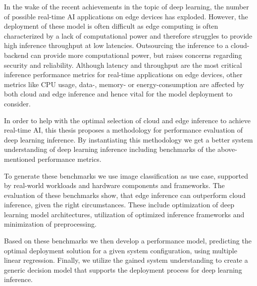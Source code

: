 \noindent In the wake of the recent achievements in the topic of deep learning, the number of possible real-time AI applications on edge devices has exploded.
However, the deployment of these model is often difficult as edge computing is often characterized by a lack of computational power and therefore struggles to provide high inference throughput at low latencies.
Outsourcing the inference to a cloud-backend can provide more computational power, but raises concerns regarding security and reliability. 
Although latency and throughput are the most critical inference performance metrics for real-time applications on edge devices, other metrics like CPU usage, data-, memory- or energy-consumption are affected by both cloud and edge inference and hence vital for the model deployment to consider.

In order to help with the optimal selection of cloud and edge inference to achieve real-time AI, this thesis proposes a methodology for performance evaluation of deep learning inference.
By instantiating this methodology we get a better system understanding of deep learning inference including benchmarks of the above-mentioned performance metrics.

To generate these benchmarks we use image classification as use case, supported by real-world workloads and hardware components and frameworks.
The evaluation of these benchmarks show, that edge inference can outperform cloud inference, given the right circumstances.
These include optimization of deep learning model architectures, utilization of optimized inference frameworks and minimization of preprocessing.


Based on these benchmarks we then develop a performance model, predicting the optimal deployment solution for a given system configuration, using multiple linear regression.
Finally, we utilize the gained system understanding to create a generic decision model that supports the deployment process for deep learning inference.




